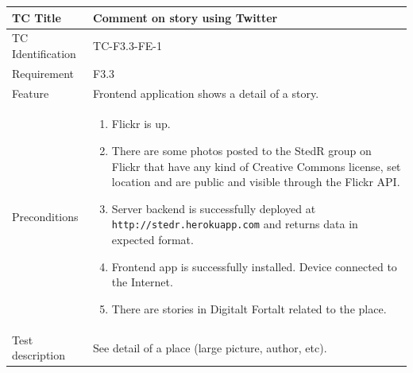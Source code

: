 \documentclass[11pt]{book}
\begin{document}
\begin{table}
  \begin{tabular}{| p{3cm} | p{9.5cm} |} \hline 
    TC Title              & Comment on story using Twitter \\ \hline 
    TC Identification     & TC-F3.3-FE-1 \\ \hline 
    Requirement           & F3.3 \\ \hline 
    Feature               & Frontend application shows a detail of a story. \\ \hline 
    Preconditions         & \begin{enumerate}
                              \item Flickr is up.
                              \item There are some photos posted to the StedR group on Flickr that have any kind of
                               Creative Commons license, set location and are public and visible through the Flickr API.
                              \item Server backend is successfully deployed at \texttt{http://stedr.herokuapp.com} and returns data in expected format.
                              \item Frontend app is successfully installed. Device connected to the Internet.
                              \item There are stories in Digitalt Fortalt related to the place.
                            \end{enumerate} \\ \hline 

    Test description      & See detail of a place (large picture, author, etc).


\end{tabular}
\end{table}
\end{document}
